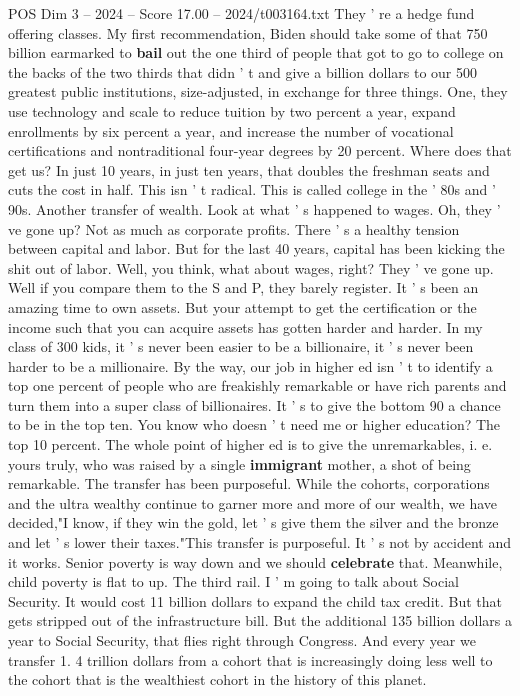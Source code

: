 \begin{textsample}{POS Dim 3 – 2024 – Score 17.00 – 2024/t003164.txt}
They ' re a hedge fund offering classes.
My first recommendation, Biden should take some of that 750 billion earmarked to \textbf{bail} out the one third of people that got to go to college on the backs of the two thirds that didn ' t and give a billion dollars to our 500 greatest public institutions, size-adjusted, in exchange for three things.
One, they use technology and scale to reduce tuition by two percent a year, expand enrollments by six percent a year, and increase the number of vocational certifications and nontraditional four-year degrees by 20 percent.
Where does that get us?
In just 10 years, in just ten years, that doubles the freshman seats and cuts the cost in half.
This isn ' t radical.
This is called college in the ' 80s and ' 90s.
Another transfer of wealth.
Look at what ' s happened to wages.
Oh, they ' ve gone up?
Not as much as corporate profits.
There ' s a healthy tension between capital and labor.
But for the last 40 years, capital has been kicking the shit out of labor.
Well, you think, what about wages, right?
They ' ve gone up.
Well if you compare them to the S and P, they barely register.
It ' s been an amazing time to own assets.
But your attempt to get the certification or the income such that you can acquire assets has gotten harder and harder.
In my class of 300 kids, it ' s never been easier to be a billionaire, it ' s never been harder to be a millionaire.
By the way, our job in higher ed isn ' t to identify a top one percent of people who are freakishly remarkable or have rich parents and turn them into a super class of billionaires.
It ' s to give the bottom 90 a chance to be in the top ten.
You know who doesn ' t need me or higher education?
The top 10 percent.
The whole point of higher ed is to give the unremarkables, i. e. yours truly, who was raised by a single \textbf{immigrant} mother, a shot of being remarkable.
The transfer has been purposeful.
While the cohorts, corporations and the ultra wealthy continue to garner more and more of our wealth, we have decided,"I know, if they win the gold, let ' s give them the silver and the bronze and let ' s lower their taxes."This transfer is purposeful.
It ' s not by accident and it works.
Senior poverty is way down and we should \textbf{celebrate} that.
Meanwhile, child poverty is flat to up.
The third rail.
I ' m going to talk about Social Security.
It would cost 11 billion dollars to expand the child tax credit.
But that gets stripped out of the infrastructure bill.
But the additional 135 billion dollars a year to Social Security, that flies right through Congress.
And every year we transfer 1. 4 trillion dollars from a cohort that is increasingly doing less well to the cohort that is the wealthiest cohort in the history of this planet.

\end{textsample}
